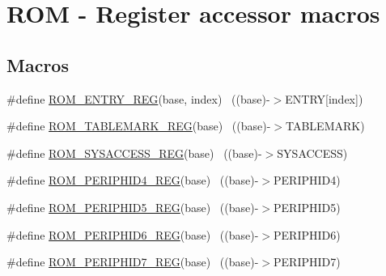 \hypertarget{group___r_o_m___register___accessor___macros}{}\section{R\+OM -\/ Register accessor macros}
\label{group___r_o_m___register___accessor___macros}
\subsection*{Macros}
\begin{DoxyCompactItemize}
\item 
\#define \hyperlink{group___r_o_m___register___accessor___macros_gaa621177d86d2cbf2946deff1d6b18d97}{R\+O\+M\+\_\+\+E\+N\+T\+R\+Y\+\_\+\+R\+EG}(base,  index)                            ~((base)-\/$>$E\+N\+T\+RY\mbox{[}index\mbox{]})
\item 
\#define \hyperlink{group___r_o_m___register___accessor___macros_gae38a845f1b34c61dcea35cd3ebf86301}{R\+O\+M\+\_\+\+T\+A\+B\+L\+E\+M\+A\+R\+K\+\_\+\+R\+EG}(base)                                ~((base)-\/$>$T\+A\+B\+L\+E\+M\+A\+RK)
\item 
\#define \hyperlink{group___r_o_m___register___accessor___macros_gabd040aeef220d6d2233d09a72a385f21}{R\+O\+M\+\_\+\+S\+Y\+S\+A\+C\+C\+E\+S\+S\+\_\+\+R\+EG}(base)                                ~((base)-\/$>$S\+Y\+S\+A\+C\+C\+E\+SS)
\item 
\#define \hyperlink{group___r_o_m___register___accessor___macros_ga83b2ccedaca218ab169a90049f73e11b}{R\+O\+M\+\_\+\+P\+E\+R\+I\+P\+H\+I\+D4\+\_\+\+R\+EG}(base)                                ~((base)-\/$>$P\+E\+R\+I\+P\+H\+I\+D4)
\item 
\#define \hyperlink{group___r_o_m___register___accessor___macros_gac221e36533218184b707e454afaaa359}{R\+O\+M\+\_\+\+P\+E\+R\+I\+P\+H\+I\+D5\+\_\+\+R\+EG}(base)                                ~((base)-\/$>$P\+E\+R\+I\+P\+H\+I\+D5)
\item 
\#define \hyperlink{group___r_o_m___register___accessor___macros_gaa17fd4c87fd03067cc92e50bd19d80f2}{R\+O\+M\+\_\+\+P\+E\+R\+I\+P\+H\+I\+D6\+\_\+\+R\+EG}(base)                                ~((base)-\/$>$P\+E\+R\+I\+P\+H\+I\+D6)
\item 
\#define \hyperlink{group___r_o_m___register___accessor___macros_gafc33cdefda2f13fd467d3dd8a277bc71}{R\+O\+M\+\_\+\+P\+E\+R\+I\+P\+H\+I\+D7\+\_\+\+R\+EG}(base)                                ~((base)-\/$>$P\+E\+R\+I\+P\+H\+I\+D7)
\item 

\end{DoxyCompactItemize}
